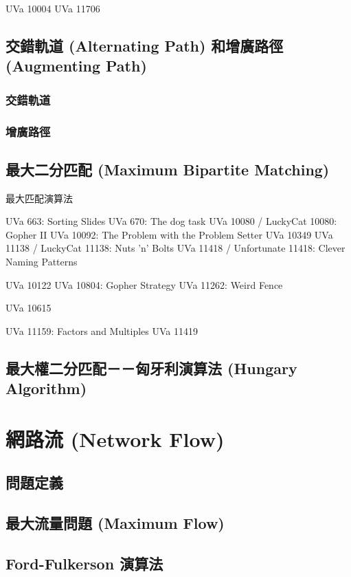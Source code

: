 \documentclass[12pt,a4paper,oneside]{report}
\begin{document}
\begin{CJK}{UTF8}{bkai}
UVa 10004
UVa 11706

\subsection{交錯軌道 (Alternating Path) 和增廣路徑 (Augmenting Path)}

\subsubsection{交錯軌道}

\subsubsection{增廣路徑}

\subsection{最大二分匹配 (Maximum Bipartite Matching)}

\begin{algorithm}
\caption{最大匹配演算法}
\end{algorithm}

UVa 663: Sorting Slides
UVa 670: The dog task
UVa 10080 / LuckyCat 10080: Gopher II
UVa 10092: The Problem with the Problem Setter
UVa 10349
UVa 11138 / LuckyCat 11138: Nuts 'n' Bolts
UVa 11418 / Unfortunate 11418: Clever Naming Patterns

UVa 10122
UVa 10804: Gopher Strategy
UVa 11262: Weird Fence

UVa 10615

UVa 11159: Factors and Multiples
UVa 11419

\subsection{最大權二分匹配－－匈牙利演算法 (Hungary Algorithm)}

\section{網路流 (Network Flow)}
\subsection{問題定義}
\subsection{最大流量問題 (Maximum Flow)}
\subsection{Ford-Fulkerson 演算法}

\end{CJK}
\end{document}
